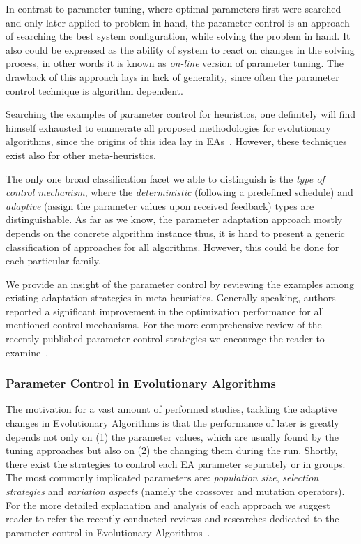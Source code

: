 In contrast to parameter tuning, where optimal parameters first were searched and only later applied to problem in hand, the parameter control is an approach of searching the best system configuration, while solving the problem in hand. It also could be expressed as the ability of system to react on changes in the solving process, in other words it is known as \textit{on-line} version of parameter tuning. The drawback of this approach lays in lack of generality, since often the parameter control technique is algorithm dependent.

Searching the examples of parameter control for heuristics, one definitely will find himself exhausted to enumerate all proposed methodologies for evolutionary algorithms, since the origins of this idea lay in EAs~\cite{karafotias2014parameter}. However, these techniques exist also for other meta-heuristics.

The only one broad classification facet we able to distinguish is the \emph{type of control mechanism}, where the \emph{deterministic} (following a predefined schedule) and \emph{adaptive} (assign the parameter values upon received feedback) types are distinguishable. As far as we know, the parameter adaptation approach mostly depends on the concrete algorithm instance thus, it is hard to present a generic classification of approaches for all algorithms. However, this could be done for each particular family.

We provide an insight of the parameter control by reviewing the examples among existing adaptation strategies in meta-heuristics.
Generally speaking, authors reported a significant improvement in the optimization performance for all mentioned control mechanisms. For the more comprehensive review of the recently published parameter control strategies we encourage the reader to examine~\cite{huang2019survey}.


\subsubsection{Parameter Control in Evolutionary Algorithms} 
The motivation for a vast amount of performed studies, tackling the adaptive changes in Evolutionary Algorithms is that the performance of later is greatly depends not only on (1) the parameter values, which are usually found by the tuning approaches but also on (2) the changing them during the run.
Shortly, there exist the strategies to control each EA parameter separately or in groups. The most commonly implicated parameters are: \textit{population size}, \textit{selection strategies} and \textit{variation aspects} (namely the crossover and mutation operators). For the more detailed explanation and analysis of each approach we suggest reader to refer the recently conducted reviews and researches dedicated to the parameter control in Evolutionary Algorithms~\cite{karafotias2014parameter,aleti2016systematic,smith2020self}.

